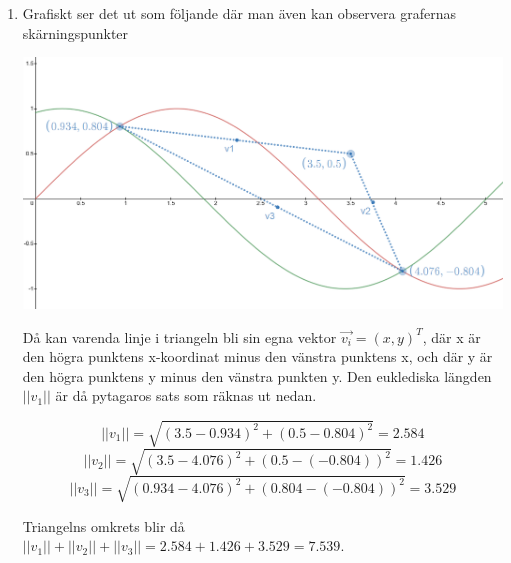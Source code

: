 \documentclass[a4paper,12pt]{article}
\begin{document}
\begin{enumerate}
      \item Grafiskt ser det ut som följande
            där man även kan observera grafernas skärningspunkter

            \includegraphics[scale=0.5]{Figur6.png}

            Då kan varenda linje i triangeln bli sin egna vektor $\vec{v_i}=(x,y)^T$, där
            x är den högra punktens x-koordinat minus den vänstra punktens x, och där y är den högra punktens y minus
            den vänstra punkten y. Den euklediska längden $||v_1||$ är då pytagaros sats som räknas ut nedan.

            $$||v_1||=\sqrt{(3.5-0.934)^2+(0.5-0.804)^2}=2.584$$
            $$||v_2||=\sqrt{(3.5-4.076)^2+(0.5-(-0.804))^2}=1.426$$
            $$||v_3||=\sqrt{(0.934-4.076)^2+(0.804-(-0.804))^2}=3.529$$

            Triangelns omkrets blir då $||v_1||+||v_2||+||v_3||=2.584+1.426+3.529=7.539$.
\end{enumerate}
\end{document}
